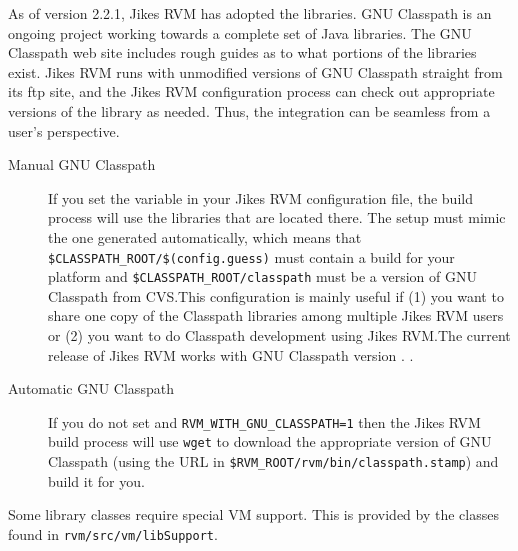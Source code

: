  As of version 2.2.1, Jikes\TMweb{} RVM has adopted the
 libraries.  GNU
Classpath is an ongoing project working towards a complete set of
Java\TMweb{} libraries.  The GNU Classpath web site includes
rough guides as to what portions of the libraries exist.  Jikes RVM
runs with unmodified versions of GNU Classpath straight from its ftp
site, and the Jikes RVM configuration process can check out
appropriate versions of the library as needed.  Thus, the integration
can be seamless from a user's perspective.

\begin{description}
\item[Manual GNU Classpath] If you set the  variable in
your Jikes RVM configuration file, the build process will use the
libraries that are located there.  The setup must mimic the one
generated automatically, which means that
{\tt \$CLASS\-PATH\_ROOT/\-\$(con\-fig.guess)} must contain a build for your platform
and {\tt \$CLASS\-PATH\_ROOT/\-class\-path} must be a version of GNU Classpath from
CVS.\@  This configuration is mainly useful if (1) you want to share one
copy of the Classpath libraries among multiple Jikes RVM users or (2)
you want to do Classpath development using Jikes RVM.\@ The
current release of Jikes RVM works with GNU Classpath version
\classpathversion.  .

\item[Automatic GNU Classpath] If you do not set  and 
{\tt RVM\_\-WITH\_\-GNU\_\-CLASS\-PATH=1} then the Jikes RVM build process
will use {\tt wget} to download the appropriate version of GNU Classpath (using
the URL in {\tt \$RVM\_\-ROOT/\-rvm/\-bin/\-class\-path.stamp}) and build it for
you. 
\end{description}

Some library classes require special VM support.  This is provided by
the classes found in {\tt rvm/\-src/\-vm/\-lib\-Sup\-port}. 

